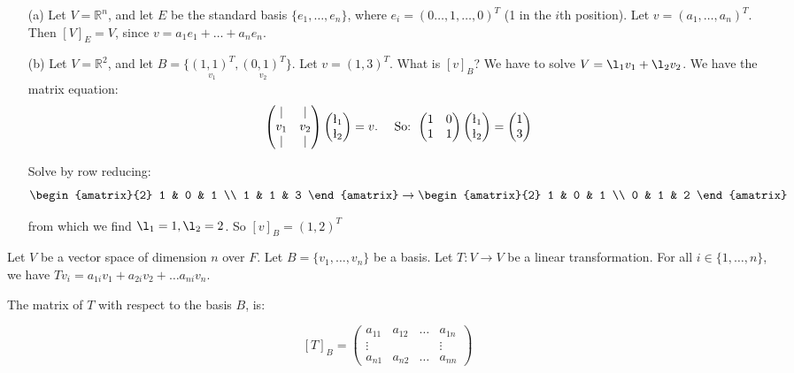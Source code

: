 \documentclass[10pt]{scrartcl}
\begin{document}
\begin{examples} \begin{itemize}
 \item[(a)] Let $V = \mathbb{R}^n$, and let $E$ be the standard basis $\{e_1,\dots,e_n\}$, where $e_i = (0\dots,1,\dots,0)^T$ (1 in the $i$th position). Let $v = (a_1, \dots ,a_n)^T.$ Then $[V]_E = V$, since $v = a_1e_1 + \dots + a_ne_n$.
 \item[(b)] Let $V = \mathbb{R}^2$, and let $B = \{\underset{v_1}{(1,1)^T},\underset{v_2}{(0,1)^T}\}$. Let $v = (1,3)^T$. What is $[v]_B$? We have to solve $V = \l_1v_1 + \l_2v_2$. We have the matrix equation:
 \[\begin{pmatrix}
| &  | \\ v_1 & v_2 \\ | & |
\end{pmatrix} 
\begin{pmatrix}
 \l_1 \\ \l_2 \end{pmatrix} = v. \quad \text{ So: }
 \begin{pmatrix}
1 & 0 \\ 1 & 1
\end{pmatrix} 
\begin{pmatrix}
 \l_1 \\ \l_2 \end{pmatrix} = \begin{pmatrix}
 1 \\ 3
 \end{pmatrix}\]


Solve by row reducing:
\[\begin{amatrix}{2}
1 & 0  & 1 \\ 1 & 1 & 3
\end{amatrix}
\rightarrow 
\begin{amatrix}{2}
1 & 0 & 1 \\ 0 & 1 & 2 
\end{amatrix}
\]

from which we find $\l_1 = 1, \l_2 = 2$. So $[v]_B = (1,2)^T$
\end{itemize} 
\end{examples}\vspace*{10pt}

\begin{definition} Let $V$ be a vector space of dimension $n$ over $F$. Let $B = \{v_1,\dots,v_n\}$ be a basis. Let $T : V \to V$ be a linear transformation. For all $i \in \{1,\dots,n\}$, we have $Tv_i = a_{1i}v_1 + a_{2i}v_2 + \dots a_{ni}v_n$.

\noindent The matrix of $T$ with respect to the basis $B$, is:

\[[T]_B = \begin{pmatrix}
 a_{11} & a_{12} & \dots & a_{1n}\\
 \vdots & &  & \vdots \\
 a_{n1} & a_{n2} & \dots & a_{nn}
 \end{pmatrix}
\]
\end{definition}
\end{document}
